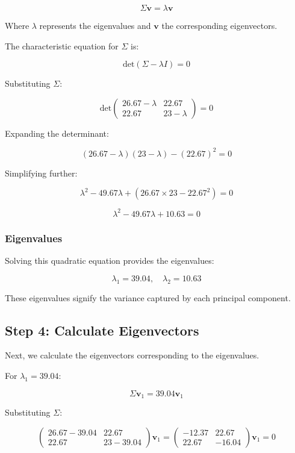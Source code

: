 \documentclass{exam}
\begin{document}
\[
\Sigma \mathbf{v} = \lambda \mathbf{v}
\]

Where \( \lambda \) represents the eigenvalues and \( \mathbf{v} \) the corresponding eigenvectors.

The characteristic equation for \( \Sigma \) is:

\[
\text{det}(\Sigma - \lambda I) = 0
\]

Substituting \( \Sigma \):

\[
\text{det} \begin{pmatrix} 26.67 - \lambda & 22.67 \\ 22.67 & 23 - \lambda \end{pmatrix} = 0
\]

Expanding the determinant:

\[
(26.67 - \lambda)(23 - \lambda) - (22.67)^2 = 0
\]

Simplifying further:

\[
\lambda^2 - 49.67\lambda + (26.67 \times 23 - 22.67^2) = 0
\]

\[
\lambda^2 - 49.67\lambda + 10.63 = 0
\]

\subsubsection*{Eigenvalues}

Solving this quadratic equation provides the eigenvalues:

\[
\lambda_1 = 39.04, \quad \lambda_2 = 10.63
\]

These eigenvalues signify the variance captured by each principal component.

\subsection{Step 4: Calculate Eigenvectors}

Next, we calculate the eigenvectors corresponding to the eigenvalues.

For \( \lambda_1 = 39.04 \):

\[
\Sigma \mathbf{v}_1 = 39.04 \mathbf{v}_1
\]

Substituting \( \Sigma \):

\[
\begin{pmatrix} 26.67 - 39.04 & 22.67 \\ 22.67 & 23 - 39.04 \end{pmatrix} \mathbf{v}_1 = \begin{pmatrix} -12.37 & 22.67 \\ 22.67 & -16.04 \end{pmatrix} \mathbf{v}_1 = 0
\]
\end{document}
